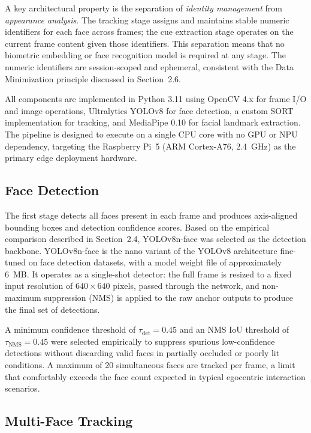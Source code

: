A key architectural property is the separation of \emph{identity management} from
\emph{appearance analysis}. The tracking stage assigns and maintains stable numeric
identifiers for each face across frames; the cue extraction stage operates on the
current frame content given those identifiers. This separation means that no biometric
embedding or face recognition model is required at any stage. The numeric identifiers
are session-scoped and ephemeral, consistent with the Data Minimization principle
discussed in Section~2.6.

All components are implemented in Python 3.11 using OpenCV 4.x for frame I/O and
image operations, Ultralytics YOLOv8 for face detection, a custom SORT implementation
for tracking, and MediaPipe 0.10 for facial landmark extraction. The pipeline is
designed to execute on a single CPU core with no GPU or NPU dependency, targeting the
Raspberry Pi~5 (ARM Cortex-A76, 2.4~GHz) as the primary edge deployment hardware.

\subsection{Face Detection}

The first stage detects all faces present in each frame and produces axis-aligned
bounding boxes and detection confidence scores. Based on the empirical comparison
described in Section~2.4, YOLOv8n-face was selected as the detection backbone.
YOLOv8n-face is the nano variant of the YOLOv8 architecture fine-tuned on face
detection datasets, with a model weight file of approximately 6~MB. It operates as a
single-shot detector: the full frame is resized to a fixed input resolution of
$640 \times 640$ pixels, passed through the network, and non-maximum suppression (NMS)
is applied to the raw anchor outputs to produce the final set of detections.

A minimum confidence threshold of $\tau_{\mathrm{det}} = 0.45$ and an NMS IoU threshold
of $\tau_{\mathrm{NMS}} = 0.45$ were selected empirically to suppress spurious low-confidence
detections without discarding valid faces in partially occluded or poorly lit conditions.
A maximum of 20 simultaneous faces are tracked per frame, a limit that comfortably
exceeds the face count expected in typical egocentric interaction scenarios.

\subsection{Multi-Face Tracking}

